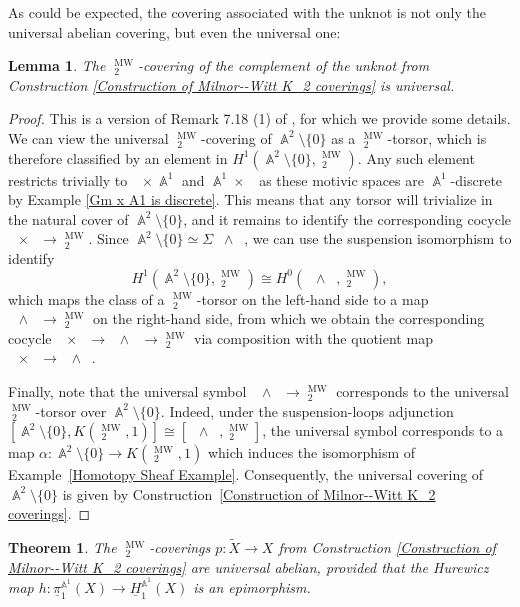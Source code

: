 \documentclass[english]{amsart}
\newtheorem{thm}[prop]{Theorem}
\newtheorem{lem}[prop]{Lemma}
\theoremstyle{definition}
\DeclareMathOperator{\A}{\mathbb{A}}
\DeclareMathOperator{\Gm}{\mathbb{G}_m}
\DeclareMathOperator{\KK}{\underline{K}}
\DeclareMathOperator{\MW}{MW}
\begin{document}
As could be expected, the covering associated with the unknot is not only the universal abelian covering, but even the universal one:
\begin{lem}\label{Unknot is Univ Covering}
The $\KK^{\MW}_2$-covering of the complement of the unknot from Construction \ref{Construction of Milnor--Witt K_2 coverings} is universal.
\end{lem}
\begin{proof}
This is a version of Remark 7.18 (1) of \cite{MR2934577}, for which we provide some details. We can view the universal $\KK^{\MW}_2$-covering of $\A^2\setminus \lbrace 0 \rbrace$ as a $\KK^{\MW}_2$-torsor, which is therefore classified by an element in $H^1(\A^2 \setminus \lbrace 0 \rbrace, \KK^{\MW}_2)$. Any such element restricts trivially to $\Gm \times \A^1$ and $\A^1 \times \Gm$ as these motivic spaces are $\A^1$-discrete by Example \ref{Gm x A1 is discrete}. This means that any torsor will trivialize in the natural cover of $\A^2 \setminus \lbrace 0\rbrace$, and it remains to identify the corresponding cocycle $\Gm \times \Gm \to \KK^{\MW}_2$. Since $\A^2\setminus\lbrace 0\rbrace\simeq \Sigma\Gm\wedge\Gm$, we can use the suspension isomorphism to identify
\[
H^1(\A^2\setminus\lbrace 0\rbrace,\KK^{\MW}_2)\cong H^0(\Gm\wedge\Gm,\KK^{\MW}_2),
\]
which maps the class of a $\KK^{\MW}_2$-torsor on the left-hand side to a map $\Gm\wedge \Gm\to \KK^{\MW}_2$ on the right-hand side, from which we obtain the corresponding cocycle $\Gm \times \Gm \to \Gm \wedge \Gm \to \KK^{\MW}_2$ via composition with the quotient map $\Gm \times \Gm \to \Gm \wedge \Gm$. 

Finally, note that the universal symbol $\Gm\wedge\Gm\to\KK^{\MW}_2$ corresponds to the universal $\KK^{\MW}_2$-torsor over $\A^2\setminus\lbrace 0\rbrace$. Indeed, under the suspension-loops adjunction $[\A^2\setminus\lbrace 0 \rbrace, K(\KK^{\MW}_2,1)] \cong [\Gm \wedge \Gm, \KK^{\MW}_2]$, the universal symbol corresponds to a map $\alpha\colon\A^2\setminus\lbrace 0\rbrace\to K(\KK^{\MW}_2,1)$ which induces the isomorphism of Example~\ref{Homotopy Sheaf Example}. Consequently, the universal covering of $\A^2\setminus\lbrace 0\rbrace$ is given by Construction~\ref{Construction of Milnor--Witt K_2 coverings}.
\end{proof}
\begin{thm}\label{Coverings are Universal}
The $\KK^{\MW}_2$-coverings $p \colon \widetilde{X} \to X$ from Construction \ref{Construction of Milnor--Witt K_2 coverings} are universal abelian, provided that the Hurewicz map $h \colon \underline{\pi}_1^{\A^1}\!(X)\to \underline{H}_1^{\A^1}\!(X)$ is an epimorphism.
\end{thm}
\end{document}
